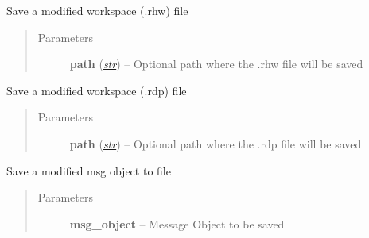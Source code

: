 \documentclass[letterpaper,10pt,english]{sphinxmanual}
\begin{document}
\begin{fulllineitems}
\begin{fulllineitems}
\label{class_Project:ROSMOD_Project.save_rhw}
Save a modified workspace (.rhw) file
\begin{quote}\begin{description}
\item[{Parameters}] \leavevmode
\textbf{path} (\href{http://docs.python.org/library/functions.html\#str}{\emph{str}}) -- Optional path where the .rhw file will be saved

\end{description}\end{quote}

\end{fulllineitems}


\begin{fulllineitems}
\label{class_Project:ROSMOD_Project.save_rdp}
Save a modified workspace (.rdp) file
\begin{quote}\begin{description}
\item[{Parameters}] \leavevmode
\textbf{path} (\href{http://docs.python.org/library/functions.html\#str}{\emph{str}}) -- Optional path where the .rdp file will be saved

\end{description}\end{quote}

\end{fulllineitems}


\begin{fulllineitems}
\label{class_Project:ROSMOD_Project.save_msg}
Save a modified msg object to file
\begin{quote}\begin{description}
\item[{Parameters}] \leavevmode
\textbf{msg\_object} -- Message Object to be saved

\end{description}\end{quote}

\end{fulllineitems}


\end{fulllineitems}
\end{document}
